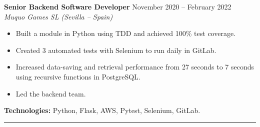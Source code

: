 \textbf{Senior Backend Software Developer} \hfill November 2020 -- February 2022\\
\textit{Muquo Games SL (Sevilla – Spain)}\\
\begin{itemize}
    \setlength{\itemsep}{0pt} %
    \setlength{\topsep}{0pt}  %
    \setlength{\parsep}{0pt}  %
    \setlength{\partopsep}{0pt} %
    \item Built a module in Python using TDD and achieved 100\% test coverage.
    \item Created 3 automated tests with Selenium to run daily in GitLab.
    \item Increased data-saving and retrieval performance from 27 seconds to 7 seconds using recursive functions in PostgreSQL.
    \item Led the backend team.
\end{itemize}
\textbf{Technologies:} Python, Flask, AWS, Pytest, Selenium, GitLab.
\hrule
\vspace{1em}
